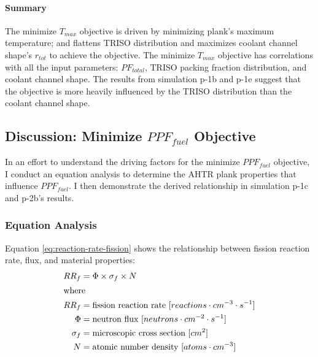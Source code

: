 \paragraph{Summary}
The minimize $T_{max}$ objective is driven by minimizing plank's maximum temperature; 
and flattens TRISO distribution and maximizes coolant channel shape's 
$r_{tot}$ to achieve the objective. 
The minimize $T_{max}$ objective has correlations with all the input parameters: 
$PF_{total}$, TRISO packing fraction distribution, and coolant channel shape. 
The results from simulation p-1b and p-1e suggest that the objective is more heavily 
influenced by the TRISO distribution than the coolant channel shape. 

\subsection{Discussion: Minimize $PPF_{fuel}$ Objective}
\label{sec:plank-discussion-ppf}
In an effort to understand the driving factors for the minimize $PPF_{fuel}$ 
objective, I conduct an equation analysis to determine the \gls{AHTR} plank properties 
that influence $PPF_{fuel}$. 
I then demonstrate the derived relationship in simulation p-1c and p-2b's results. 

\subsubsection{Equation Analysis}
\label{sec:plank-discussion-ppf-equation}
Equation \ref{eq:reaction-rate-fission} shows the relationship between fission reaction 
rate, flux, and material properties: 
\begin{align}
\label{eq:reaction-rate-fission}
    RR_f &= \Phi \times \sigma_f \times N \\
\intertext{where}
    RR_f &= \mbox{fission reaction rate } [reactions \cdot cm^{-3} \cdot s^{-1}] \nonumber \\
    \Phi &= \mbox{neutron flux } [neutrons \cdot cm^{-2} \cdot s^{-1}] \nonumber \\
    \sigma_f &= \mbox{microscopic cross section } [cm^2] \nonumber \\
    N &= \mbox{atomic number density } [atoms \cdot cm^{-3}] \nonumber 
\end{align}

